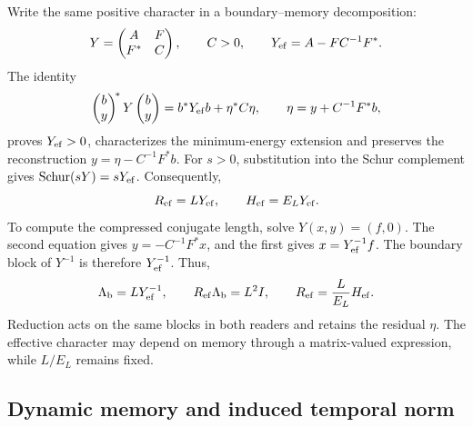 Write the same positive character in a boundary--memory decomposition:
\[
 Y=\begin{pmatrix}A&F\\F^*&C\end{pmatrix},\qquad C>0,
 \qquad Y_{\rm ef}=A-FC^{-1}F^*.
\]
The identity
\[
 \begin{pmatrix}b\\y\end{pmatrix}^{\!*}Y
 \begin{pmatrix}b\\y\end{pmatrix}
 =b^*Y_{\rm ef}b+\eta^*C\eta,
 \qquad \eta=y+C^{-1}F^*b,
\]
proves \(Y_{\rm ef}>0\), characterizes the minimum-energy
extension and preserves the reconstruction
\(y=\eta-C^{-1}F^*b\). For \(s>0\), substitution into the
Schur complement gives
\(\operatorname{Schur}(sY)=sY_{\rm ef}\). Consequently,
\[
 R_{\rm ef}=LY_{\rm ef},\qquad
 H_{\rm ef}=E_{L}Y_{\rm ef}.
\]
To compute the compressed conjugate length, solve
\(Y(x,y)=(f,0)\). The second equation gives
\(y=-C^{-1}F^*x\), and the first gives
\(x=Y_{\rm ef}^{-1}f\). The boundary block of \(Y^{-1}\)
is therefore \(Y_{\rm ef}^{-1}\). Thus,
\begin{equation}
 \Lambda_{\rm b}=LY_{\rm ef}^{-1},\qquad
 R_{\rm ef}\Lambda_{\rm b}=L^2I,\qquad
 R_{\rm ef}=\frac{L}{E_{L}}H_{\rm ef}.
 \label{g26:eq:schur-reciproco-en}
\end{equation}
Reduction acts on the same blocks in both readers and retains the
residual \(\eta\). The effective character may depend on memory
through a matrix-valued expression, while \(L/E_{L}\) remains fixed.

\subsection{Dynamic memory and induced temporal norm}

